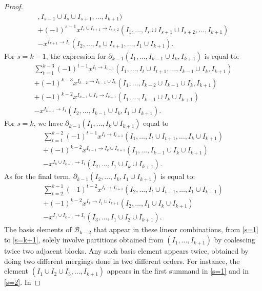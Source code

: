 \documentclass[ALCO]{cedram}
\newcommand{\mcb}{\mbox{$\mathcal{B}$}}
\newcommand{\dif}{\mbox{$\partial$}}
\begin{document}
\begin{proof}
\begin{multline}
  ,I_{s-1}\cup I_{s}\cup I_{s+1},\ldots, I_{k+1})
  \\+(-1)^{s-1}x^{I_{s}\cup I_{s+1}\to I_{s+2}}(I_1,\ldots
  ,I_{s}\cup I_{s+1}\cup I_{s+2},\ldots, I_{k+1}) \\
  -x^{I_{k+1}\to I_{1}}(I_2,\ldots ,I_s\cup I_{s+1},\ldots ,I_1\cup
  I_{k+1}).
\end{multline}
For $s=k-1$, the expression for $\dif_{k-1}(I_1,\ldots ,I_{k-1}\cup
I_k,I_{k+1})$ is equal to:
\begin{multline}\label{s=k-1}
\sum_{t=1}^{k-3}(-1)^{t-1}x^{I_t\to I_{t+1}}(I_1,\ldots ,I_t\cup
  I_{t+1},\ldots , I_{k-1}\cup I_k,I_{k+1}) \\+
  (-1)^{k-3}x^{I_{k-2}\to I_{k-1}\cup I_k}(I_1,\ldots ,I_{k-2}\cup
  I_{k-1}\cup I_k,I_{k+1}) \\+
(-1)^{k-2}x^{I_{k-1}\cup I_{k}\to I_{k+1}}(I_1,\ldots , I_{k-1}\cup I_k\cup I_{k+1})  \\
 -x^{I_{k+1}\to I_{1}}(I_2,\ldots ,I_{k-1}\cup I_{k}, I_1\cup
  I_{k+1}).
\end{multline}
For $s=k$, we have $\dif_{k-1}(I_1,\ldots ,I_k\cup I_{k+1})$ equal to
\begin{multline}\label{s=k}
 \sum_{t=1}^{k-2}(-1)^{t-1}x^{I_t\to I_{t+1}}(I_1,\ldots ,I_t\cup
  I_{t+1},\ldots , I_k\cup I_{k+1}) \\ + (-1)^{k-2}x^{I_{k-1}\to
    I_{k}\cup I_{k+1}}(I_1,\ldots ,I_{k-1}\cup I_{k}\cup I_{k+1})
 \\- x^{I_{k}\cup I_{k+1}\to I_{1}}(I_2,\ldots ,I_1\cup
  I_k\cup I_{k+1}).
\end{multline}
As for the final term, $\dif_{k-1}(I_2,\ldots,I_{k},I_1\cup
I_{k+1})$ is equal to:
\begin{multline}\label{s=k+1}
\sum_{t=2}^{k-1}(-1)^{t-2}x^{I_t\to I_{t+1}}(I_2,\ldots ,I_t\cup
I_{t+1},\ldots ,I_1\cup I_{k+1})\\ 
+(-1)^{k-2}x^{I_{k}\to I_{1}\cup I_{k+1}}(I_2,\ldots ,I_{1}\cup 
I_{k}\cup I_{k+1})\\
- x^{I_{1}\cup
I_{k+1}\to I_{2}}(I_3,\ldots ,I_1\cup I_2\cup I_{k+1}).
\end{multline}
The basis elements of $\mcb_{k-2}$ that appear in these linear
combinations, from \eqref{s=1} to \eqref{s=k+1}, solely involve
partitions obtained from $(I_1,\ldots,I_{k+1})$ by coalescing twice
two adjacent blocks. Any such basis element appears twice, obtained by
doing two different mergings done in two different orders. For
instance, the element $(I_1\cup I_2\cup I_3,\ldots ,I_{k+1})$ appears
in the first summand in \eqref{s=1} and in \eqref{s=2}. In

\end{proof}
\end{document}
